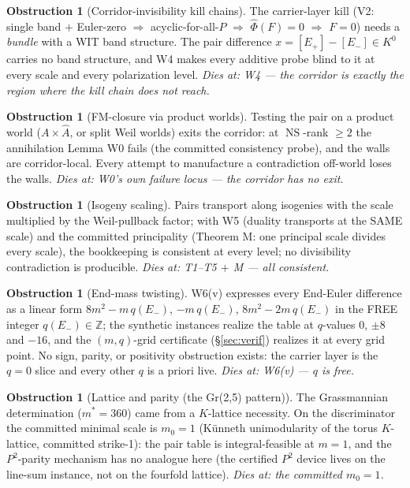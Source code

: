 \documentclass[11pt]{article}
\theoremstyle{definition}
\newtheorem{obstruction}[theorem]{Obstruction}
\newcommand{\NS}{\operatorname{NS}}
\newcommand{\Z}{\mathbb{Z}}
\newcommand{\FMc}{\widehat\Phi}
\begin{document}
\begin{obstruction}[Corridor-invisibility kill chains]
The carrier-layer kill (V2: single band $+$ Euler-zero $\Rightarrow$
acyclic-for-all-$P$ $\Rightarrow$ $\FMc(F)=0$ $\Rightarrow$ $F=0$) needs a
\emph{bundle} with a WIT band structure. The pair difference
$x=[E_+]-[E_-]\in K^0$ carries no band structure, and W4 makes every additive
probe blind to it at every scale and every polarization level.
\emph{Dies at: W4 --- the corridor is exactly the region where the kill chain
does not reach.}
\end{obstruction}

\begin{obstruction}[FM-closure via product worlds]
Testing the pair on a product world ($A\times\widehat A$, or split Weil worlds)
exits the corridor: at $\NS$-rank $\ge 2$ the annihilation Lemma W0 fails
(the committed consistency probe), and the walls are corridor-local. Every
attempt to manufacture a contradiction off-world loses the walls.
\emph{Dies at: W0's own failure locus --- the corridor has no exit.}
\end{obstruction}

\begin{obstruction}[Isogeny scaling]
Pairs transport along isogenies with the scale multiplied by the Weil-pullback
factor; with W5 (duality transports at the SAME scale) and the committed
principality (Theorem M: one principal scale divides every scale), the bookkeeping
is consistent at every level; no divisibility contradiction is producible.
\emph{Dies at: T1--T5 $+$ M --- all consistent.}
\end{obstruction}

\begin{obstruction}[End-mass twisting]
W6(v) expresses every End-Euler difference as a linear form
$8m^2-m\,q(E_-)$, $-m\,q(E_-)$, $8m^2-2m\,q(E_-)$ in the FREE integer
$q(E_-)\in\Z$; the synthetic instances realize the table at $q$-values $0$, $\pm 8$
and $-16$, and the $(m,q)$-grid certificate (\S\ref{sec:verif}) realizes it
at every grid point. No sign, parity, or positivity obstruction exists: the
carrier layer is the $q=0$ slice and every other $q$ is a priori live.
\emph{Dies at: W6(v) --- $q$ is free.}
\end{obstruction}

\begin{obstruction}[Lattice and parity (the Gr(2,5) pattern)]
The Grassmannian determination ($m^*=360$) came from a $K$-lattice necessity.
On the discriminator the committed minimal scale is $m_0=1$ (K\"unneth
unimodularity of the torus $K$-lattice, committed strike-1): the pair table is
integral-feasible at $m=1$, and the $P^2$-parity mechanism has no analogue here
(the certified $P^2$ device lives on the line-sum instance, not on the fourfold
lattice). \emph{Dies at: the committed $m_0=1$.}
\end{obstruction}
\end{document}
